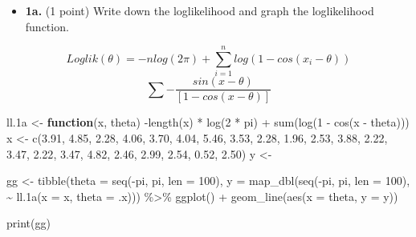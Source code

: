 \documentclass[
]{article}
\newenvironment{Shaded}{\begin{snugshade}}{\end{snugshade}}
\newcommand{\AttributeTok}[1]{\textcolor[rgb]{0.77,0.63,0.00}{#1}}
\newcommand{\ControlFlowTok}[1]{\textcolor[rgb]{0.13,0.29,0.53}{\textbf{#1}}}
\newcommand{\DecValTok}[1]{\textcolor[rgb]{0.00,0.00,0.81}{#1}}
\newcommand{\FloatTok}[1]{\textcolor[rgb]{0.00,0.00,0.81}{#1}}
\newcommand{\FunctionTok}[1]{\textcolor[rgb]{0.00,0.00,0.00}{#1}}
\newcommand{\NormalTok}[1]{#1}
\newcommand{\OtherTok}[1]{\textcolor[rgb]{0.56,0.35,0.01}{#1}}
\newcommand{\SpecialCharTok}[1]{\textcolor[rgb]{0.00,0.00,0.00}{#1}}
\providecommand{\tightlist}{%
  \setlength{\itemsep}{0pt}\setlength{\parskip}{0pt}}
\begin{document}
\begin{itemize}
\tightlist
\item
  \textbf{1a.} (1 point) Write down the loglikelihood and graph the
  loglikelihood function.
\end{itemize}

\[Loglik(\theta) = - nlog(2\pi) + \sum_{i = 1}^nlog(1 - cos(x_i - \theta))\]
\[\sum-\frac{sin(x - \theta)}{[1 - cos(x - \theta)]}\]

\begin{Shaded}
\begin{Highlighting}[]
\NormalTok{ll}\FloatTok{.1}\NormalTok{a }\OtherTok{\textless{}{-}} \ControlFlowTok{function}\NormalTok{(x, theta) }\SpecialCharTok{{-}}\FunctionTok{length}\NormalTok{(x) }\SpecialCharTok{*} \FunctionTok{log}\NormalTok{(}\DecValTok{2} \SpecialCharTok{*}\NormalTok{ pi) }\SpecialCharTok{+} \FunctionTok{sum}\NormalTok{(}\FunctionTok{log}\NormalTok{(}\DecValTok{1} \SpecialCharTok{{-}} \FunctionTok{cos}\NormalTok{(x }\SpecialCharTok{{-}}\NormalTok{ theta)))}
\NormalTok{x }\OtherTok{\textless{}{-}} \FunctionTok{c}\NormalTok{(}\FloatTok{3.91}\NormalTok{, }\FloatTok{4.85}\NormalTok{, }\FloatTok{2.28}\NormalTok{, }\FloatTok{4.06}\NormalTok{, }\FloatTok{3.70}\NormalTok{, }\FloatTok{4.04}\NormalTok{, }\FloatTok{5.46}\NormalTok{, }\FloatTok{3.53}\NormalTok{, }\FloatTok{2.28}\NormalTok{, }\FloatTok{1.96}\NormalTok{, }\FloatTok{2.53}\NormalTok{, }\FloatTok{3.88}\NormalTok{, }\FloatTok{2.22}\NormalTok{, }\FloatTok{3.47}\NormalTok{, }\FloatTok{2.22}\NormalTok{, }\FloatTok{3.47}\NormalTok{, }\FloatTok{4.82}\NormalTok{, }\FloatTok{2.46}\NormalTok{, }\FloatTok{2.99}\NormalTok{, }\FloatTok{2.54}\NormalTok{, }\FloatTok{0.52}\NormalTok{, }\FloatTok{2.50}\NormalTok{)}
\NormalTok{y }\OtherTok{\textless{}{-}} 

\NormalTok{gg }\OtherTok{\textless{}{-}} \FunctionTok{tibble}\NormalTok{(}\AttributeTok{theta =} \FunctionTok{seq}\NormalTok{(}\SpecialCharTok{{-}}\NormalTok{pi, pi, }\AttributeTok{len =} \DecValTok{100}\NormalTok{), }
       \AttributeTok{y =} \FunctionTok{map\_dbl}\NormalTok{(}\FunctionTok{seq}\NormalTok{(}\SpecialCharTok{{-}}\NormalTok{pi, pi, }\AttributeTok{len =} \DecValTok{100}\NormalTok{), }
                   \SpecialCharTok{\textasciitilde{}} \FunctionTok{ll.1a}\NormalTok{(}\AttributeTok{x =}\NormalTok{ x, }\AttributeTok{theta =}\NormalTok{ .x))) }\SpecialCharTok{\%\textgreater{}\%}
  \FunctionTok{ggplot}\NormalTok{() }\SpecialCharTok{+} 
  \FunctionTok{geom\_line}\NormalTok{(}\FunctionTok{aes}\NormalTok{(}\AttributeTok{x =}\NormalTok{ theta, }\AttributeTok{y =}\NormalTok{ y))}

\FunctionTok{print}\NormalTok{(gg)}
\end{Highlighting}
\end{Shaded}
\end{document}
